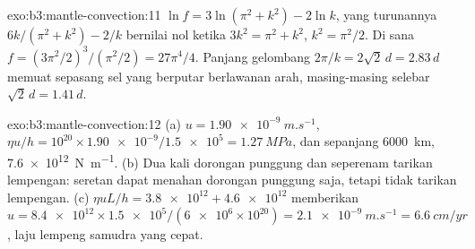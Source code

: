 \begin{solution}{exo:b3:mantle-convection:11}
$\ln f = 3\ln(\pi^2 + k^2) - 2\ln k$, yang turunannya $6k/(\pi^2 + k^2) - 2/k$
bernilai nol ketika $3k^2 = \pi^2 + k^2$, $k^2 = \pi^2/2$. Di sana $f = (3\pi^2/2)^3/
(\pi^2/2) = 27\pi^4/4$. Panjang gelombang $2\pi/k = 2\sqrt2\,d = 2.83\,d$ memuat
sepasang sel yang berputar berlawanan arah, masing-masing selebar $\sqrt2\,d = 1.41\,d$.
\end{solution}

\begin{solution}{exo:b3:mantle-convection:12}
(a) $u = \qty{1.90e-9}{m.s^{-1}}$, $\eta u/h = 10^{20}\times\num{1.90e-9}/
\num{1.5e5} = \qty{1.27}{MPa}$, dan sepanjang \qty{6000}{km}, \qty{7.6e12}{N.m^{-1}}.
(b) Dua kali dorongan punggung dan seperenam tarikan lempengan: seretan dapat menahan
dorongan punggung saja, tetapi tidak tarikan lempengan. (c) $\eta uL/h = \num{3.8e12} +
\num{4.6e12}$ memberikan $u = \num{8.4e12}\times\num{1.5e5}/(\num{6e6}\times10^{20})
= \qty{2.1e-9}{m.s^{-1}} = \qty{6.6}{cm/yr}$, laju lempeng samudra
yang cepat.
\end{solution}

